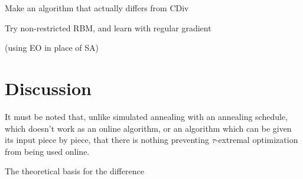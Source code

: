 \documentclass[12pt]{article}
\begin{document}
  Make an algorithm that actually differs from CDiv

  Try non-restricted RBM, and learn with regular gradient

  (using EO in place of SA)






\section{Discussion}

It must be noted that, unlike simulated annealing with an annealing schedule, which doesn't work as an online algorithm, or an algorithm which can be given its input piece by piece, that there is nothing preventing $\tau$-extremal optimization from being used online.

The theoretical basis for the difference 


\end{document}
